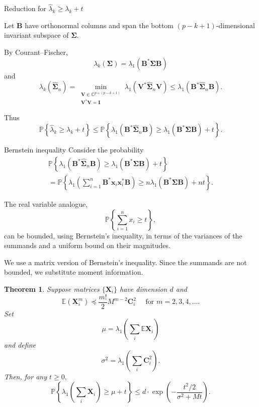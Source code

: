 \documentclass[pdf,mpa]{prosper}
\newcommand{\mat}[1]{\ensuremath{\mathbf{#1}}}
\newcommand{\Prob}[1]{\ensuremath{\mathbb{P}\left\{#1 \right\}}}
\renewcommand{\star}{*}
\newcommand{\E}{\ensuremath{\mathbb{E}}}
\newcommand{\C}{\ensuremath{\mathbb{C}}}
\newtheorem*{thm}{Theorem}
\begin{document}
\begin{slide}{Reduction for $\hat{\lambda}_k \geq \lambda_k + t$}

Let $\mat{B}$ have orthonormal columns and span the bottom $(p-k+1)$-dimensional invariant subspace of $\mat{\Sigma}.$

By Courant--Fischer,
\[
 \lambda_k(\mat{\Sigma}) = \lambda_1(\mat{B}^\star \mat{\Sigma} \mat{B})
\]
and
\[
\lambda_k(\widehat{\mat{\Sigma}}_n) = \min_{\substack{ \mat{V} \in \C^{p \times (p-k+1)} \\ \mat{V}^\star\mat{V}=\mat{I}}} \lambda_1(\mat{V}^\star \widehat{\mat{\Sigma}}_n\mat{V}) \leq \lambda_1(\mat{B}^\star \widehat{\mat{\Sigma}}_n \mat{B}).
\]
 
Thus 
\[
\Prob{\hat{\lambda}_k \geq \lambda_k + t } \leq \Prob{\lambda_1(\mat{B}^\star \widehat{\mat{\Sigma}}_n \mat{B}) \geq  \lambda_1(\mat{B}^\star \mat{\Sigma} \mat{B}) + t }.
\]

\end{slide}

\begin{slide}{Bernstein inequality}
 Consider the probability
\begin{multline*}
 \Prob{\lambda_1(\mat{B}^\star \widehat{\mat{\Sigma}}_n \mat{B}) \geq  \lambda_1(\mat{B}^\star \mat{\Sigma} \mat{B}) + t } \\
 = \Prob{\lambda_1\left(\sum_{i=1}^n \mat{B}^\star \mat{x}_i \mat{x}_i^\star \mat{B} \right) \geq n \lambda_1(\mat{B}^\star \mat{\Sigma} \mat{B}) + n t}.
\end{multline*}

The real variable analogue,
\[
 \Prob{ \sum_{i=1}^n x_i \geq t },
\]
can be bounded, using Bernstein's inequality, in terms of the variances of the summands and a uniform bound on their magnitudes.
\end{slide}

\begin{slide}{}
 We use a matrix version of Bernstein's inequality. Since the summands are not bounded, we substitute moment information.

\begin{thm}
Suppose matrices $\{\mat{X}_i\}$ have dimension $d$ and 
\[\textstyle \E(\mat{X}_i^m) \preceq \frac{m!}{2} M^{m-2} \mat{C}_i^2 \quad \text{ for } m =2,3,4,\ldots.
\]
Set
\[ \textstyle \mu = \lambda_1\left( \sum_i \E\mat{X}_i \right) \]
and define
\[ \textstyle \sigma^2 = \lambda_1\left(\sum_i \mat{C}_i^2 \right). \]
Then, for any $t \geq 0,$
\[	
 \textstyle \Prob{ \lambda_1\left(\sum_i \mat{X}_i\right) \geq \mu + t } \leq d \cdot \exp\left(- \frac{t^2/2}{\sigma^2 + Mt} \right).
\]
\end{thm}

\end{slide}
\end{document}
